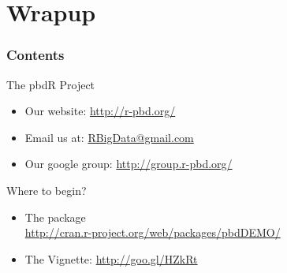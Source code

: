 \section{Wrapup}

\hidenum
\begin{frame}[noframenumbering]
\frametitle{Contents}
 \tableofcontents[currentsection,hideothersubsections,sectionstyle=show/hide]
\end{frame}
\shownum

\begin{frame}
  \begin{block}{The pbdR Project}
    \begin{itemize}
      \item Our website: \url{http://r-pbd.org/}
      \item Email us at: \url{RBigData@gmail.com}
      \item Our google group: \url{http://group.r-pbd.org/}
     \end{itemize}
\end{block}
  \begin{block}{Where to begin?}
    \begin{itemize}
      \item The  package\\
      \url{http://cran.r-project.org/web/packages/pbdDEMO/}\\
      \item The  Vignette: \url{http://goo.gl/HZkRt}
    \end{itemize}
\end{block}
\end{frame}


\section*{}



